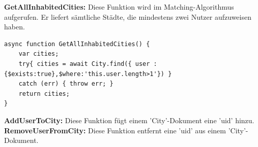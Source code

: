 \noindent
\textbf{GetAllInhabitedCities:}
Diese Funktion wird im Matching-Algorithmus aufgerufen. Er liefert sämtliche Städte, die mindestens zwei Nutzer aufzuweisen haben. 

\begin{lstlisting}[caption=City Service - GetAllInhabitedCities, label=lst:cityServiceGetAllInhabitedCities]
async function GetAllInhabitedCities() {
    var cities;
    try{ cities = await City.find({ user : {$exists:true},$where:'this.user.length>1'}) }
    catch (err) { throw err; }
    return cities;
}
\end{lstlisting}

\noindent
\textbf{AddUserToCity:}
Diese Funktion fügt einem 'City'-Dokument eine 'uid' hinzu.\\

\noindent
\textbf{RemoveUserFromCity:}
Diese Funktion entfernt eine 'uid' aus einem 'City'-Dokument.
